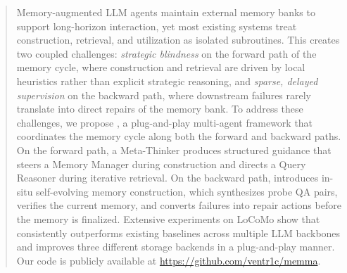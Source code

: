 \begin{abstract}
Memory-augmented LLM agents maintain external memory banks to support long-horizon interaction, yet most existing systems treat construction, retrieval, and utilization as isolated subroutines. This creates two coupled challenges: \emph{strategic blindness} on the forward path of the memory cycle, where construction and retrieval are driven by local heuristics rather than explicit strategic reasoning, and \emph{sparse, delayed supervision} on the backward path, where downstream failures rarely translate into direct repairs of the memory bank. To address these challenges, we propose \method, a plug-and-play multi-agent framework that coordinates the memory cycle along both the forward and backward paths. On the forward path, a Meta-Thinker produces structured guidance that steers a Memory Manager during construction and directs a Query Reasoner during iterative retrieval. On the backward path, \method introduces in-situ self-evolving memory construction, which synthesizes probe QA pairs, verifies the current memory, and converts failures into repair actions before the memory is finalized. Extensive experiments on LoCoMo show that \method consistently outperforms existing baselines across multiple LLM backbones and improves three different storage backends in a plug-and-play manner. Our code is publicly available at 
\url{https://github.com/ventr1c/memma}.
\end{abstract}


